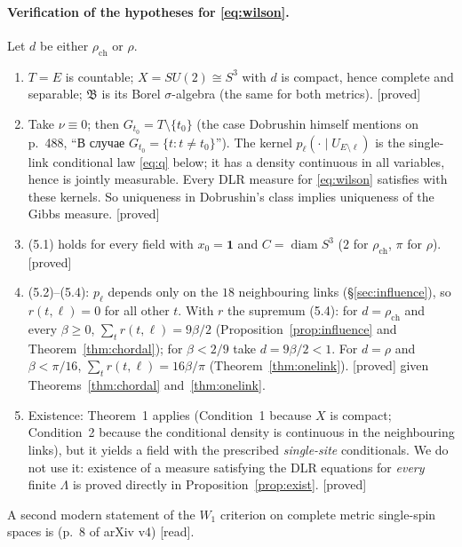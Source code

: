 \documentclass[11pt,a4paper]{article}
\theoremstyle{remark}
\theoremstyle{definition}
\theoremstyle{plain}
\theoremstyle{remark}
\newcommand{\st}[1]{\textsf{[#1]}}
\newcommand{\ru}[1]{\foreignlanguage{russian}{#1}}
\newcommand{\rch}{\rho_{\mathrm{ch}}}
\begin{document}
\paragraph{Verification of the hypotheses for \eqref{eq:wilson}.} Let $d$ be either $\rch$ or $\rho$.
\begin{enumerate}
\item $T=E$ is countable; $X=SU(2)\cong S^3$ with $d$ is compact, hence complete and separable;
$\mathfrak B$ is its Borel $\sigma$-algebra (the same for both metrics). \st{proved}
\item Take $\nu\equiv0$; then $G_{t_0}=T\setminus\{t_0\}$ (the case Dobrushin himself mentions on
p.~488, ``\ru{В случае $G_{t_0}=\{t:t\neq t_0\}$}''). The kernel $p_{\ell}(\cdot\mid U_{E\setminus\ell})$ is
the single-link conditional law \eqref{eq:q} below; it has a density continuous in all variables, hence
is jointly measurable. Every DLR measure for \eqref{eq:wilson} satisfies \cite[(1.3)]{Dob70} with these
kernels. So uniqueness in Dobrushin's class implies uniqueness of the Gibbs measure. \st{proved}
\item (5.1) holds for every field with $x_0=\mathbf 1$ and $C=\operatorname{diam}S^3$ ($2$ for $\rch$, $\pi$ for $\rho$). \st{proved}
\item (5.2)--(5.4): $p_\ell$ depends only on the $18$ neighbouring links (\S\ref{sec:influence}), so
$r(t,\ell)=0$ for all other $t$. With $r$ the supremum (5.4): for $d=\rch$ and every $\beta\ge0$,
$\sum_t r(t,\ell)=9\beta/2$ (Proposition~\ref{prop:influence} and Theorem~\ref{thm:chordal}); for $\beta<2/9$ take $d=9\beta/2<1$.
For $d=\rho$ and $\beta<\pi/16$, $\sum_t r(t,\ell)=16\beta/\pi$ (Theorem~\ref{thm:onelink}). \st{proved} given
Theorems~\ref{thm:chordal} and~\ref{thm:onelink}.
\item Existence: Theorem~1 applies (Condition~1 because $X$ is compact; Condition~2 because the
conditional density is continuous in the neighbouring links), but it yields a field with the
prescribed \emph{single-site} conditionals. We do not use it: existence of a measure satisfying the DLR
equations for \emph{every} finite $\Lambda$ is proved directly in Proposition~\ref{prop:exist}. \st{proved}
\end{enumerate}
A second modern statement of the $W_1$ criterion on complete metric single-spin spaces is
\cite[Thm~3.5]{DS25} (p.~8 of arXiv v4) \st{read}.
\end{document}
